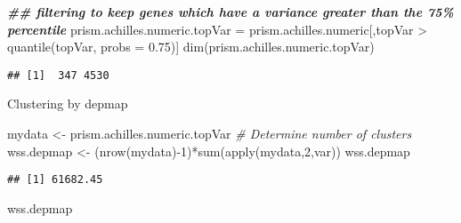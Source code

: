 \documentclass[
]{article}
\newenvironment{Shaded}{\begin{snugshade}}{\end{snugshade}}
\newcommand{\AttributeTok}[1]{\textcolor[rgb]{0.77,0.63,0.00}{#1}}
\newcommand{\CommentTok}[1]{\textcolor[rgb]{0.56,0.35,0.01}{\textit{#1}}}
\newcommand{\ControlFlowTok}[1]{\textcolor[rgb]{0.13,0.29,0.53}{\textbf{#1}}}
\newcommand{\DecValTok}[1]{\textcolor[rgb]{0.00,0.00,0.81}{#1}}
\newcommand{\DocumentationTok}[1]{\textcolor[rgb]{0.56,0.35,0.01}{\textbf{\textit{#1}}}}
\newcommand{\FloatTok}[1]{\textcolor[rgb]{0.00,0.00,0.81}{#1}}
\newcommand{\FunctionTok}[1]{\textcolor[rgb]{0.00,0.00,0.00}{#1}}
\newcommand{\NormalTok}[1]{#1}
\newcommand{\OtherTok}[1]{\textcolor[rgb]{0.56,0.35,0.01}{#1}}
\newcommand{\SpecialCharTok}[1]{\textcolor[rgb]{0.00,0.00,0.00}{#1}}
\begin{document}
\begin{Shaded}
\begin{Highlighting}[]
\DocumentationTok{\#\# filtering to keep genes which have a variance greater than the 75\% percentile}
\NormalTok{prism.achilles.numeric.topVar }\OtherTok{=}\NormalTok{ prism.achilles.numeric[,topVar }\SpecialCharTok{\textgreater{}} \FunctionTok{quantile}\NormalTok{(topVar, }\AttributeTok{probs =} \FloatTok{0.75}\NormalTok{)] }
\FunctionTok{dim}\NormalTok{(prism.achilles.numeric.topVar)}
\end{Highlighting}
\end{Shaded}

\begin{verbatim}
## [1]  347 4530
\end{verbatim}

Clustering by depmap

\begin{Shaded}
\begin{Highlighting}[]
\NormalTok{mydata }\OtherTok{\textless{}{-}}\NormalTok{ prism.achilles.numeric.topVar}
\CommentTok{\# Determine number of clusters}
\NormalTok{wss.depmap }\OtherTok{\textless{}{-}}\NormalTok{ (}\FunctionTok{nrow}\NormalTok{(mydata)}\SpecialCharTok{{-}}\DecValTok{1}\NormalTok{)}\SpecialCharTok{*}\FunctionTok{sum}\NormalTok{(}\FunctionTok{apply}\NormalTok{(mydata,}\DecValTok{2}\NormalTok{,var))}
\NormalTok{wss.depmap}
\end{Highlighting}
\end{Shaded}

\begin{verbatim}
## [1] 61682.45
\end{verbatim}

\begin{Shaded}
\end{Shaded}

\begin{Shaded}
\begin{Highlighting}[]
\NormalTok{wss.depmap}
\end{Highlighting}
\end{Shaded}
\end{document}
